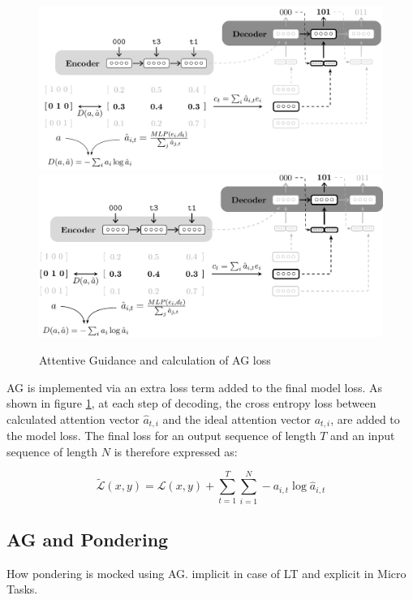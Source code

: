 \begin{figure}
	\begin{minipage}[t]{\textwidth}
		\ifpdf
		\includegraphics[width=\linewidth,keepaspectratio=true]{./figs/ag-model-pdf}
		\else
		\includegraphics[width=\linewidth,keepaspectratio=true]{./figs/ag-model-eps}
		\fi
		\caption{\small Attentive Guidance and calculation of AG loss \citep{Hupkes2018}}
		\label{pm:ag-loss}
	\end{minipage}
\end{figure}

AG is implemented via an extra loss term added to the final model loss. As shown in figure \ref{pm:ag-loss}, at each step of decoding, the cross entropy loss between calculated attention vector $\hat{a}_{t,i}$ and the ideal attention vector $a_{t,i}$, are added to the model loss. The final loss for an output sequence of length $T$ and an input sequence of length $N$ is therefore expressed as:

\begin{equation}
\widetilde{\mathcal{L}}(x,y) = \mathcal{L}(x,y) + \sum_{t=1}^T \sum_{i=1}^N -a_{i,t}\log\hat{a}_{i,t}
\end{equation}

\subsection{AG and Pondering} \label{pm:ag-ponder}
How pondering is mocked using AG. implicit in case of LT and explicit in Micro Tasks. 


